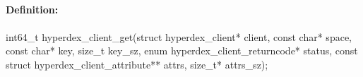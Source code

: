 %
%
%


\pagebreak
\subsection{}
\label{api:c:get}


\paragraph{Definition:}
\begin{ccode}
int64_t hyperdex_client_get(struct hyperdex_client* client,
        const char* space,
        const char* key, size_t key_sz,
        enum hyperdex_client_returncode* status,
        const struct hyperdex_client_attribute** attrs, size_t* attrs_sz);
\end{ccode}

